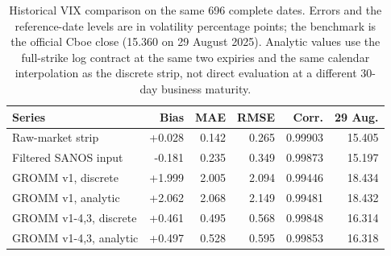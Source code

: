 \begin{table}[H]
\centering\small
\begin{tabular}{lrrrrr}
\toprule
Series & Bias & MAE & RMSE & Corr. & 29 Aug. \\
\midrule
Raw-market strip & +0.028 & 0.142 & 0.265 & 0.99903 & 15.405 \\
Filtered SANOS input & -0.181 & 0.235 & 0.349 & 0.99873 & 15.197 \\
GROMM v1, discrete & +1.999 & 2.005 & 2.094 & 0.99446 & 18.434 \\
GROMM v1, analytic & +2.062 & 2.068 & 2.149 & 0.99481 & 18.432 \\
GROMM v1-4,3, discrete & +0.461 & 0.495 & 0.568 & 0.99848 & 16.314 \\
GROMM v1-4,3, analytic & +0.497 & 0.528 & 0.595 & 0.99853 & 16.318 \\
\bottomrule
\end{tabular}
\caption{Historical VIX comparison on the same 696 complete dates. Errors and the reference-date levels are in volatility percentage points; the benchmark is the official Cboe close (15.360 on 29 August 2025). Analytic values use the full-strike log contract at the same two expiries and the same calendar interpolation as the discrete strip, not direct evaluation at a different 30-day business maturity.}
\label{tab:wide-vix}
\end{table}
